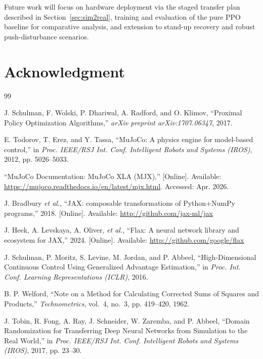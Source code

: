 \documentclass[conference]{IEEEtran}
\begin{document}
Future work will focus on hardware deployment via the staged transfer
plan described in Section~\ref{sec:sim2real}, training and evaluation
of the pure PPO baseline for comparative analysis, and extension to
stand-up recovery and robust push-disturbance scenarios.

\section*{Acknowledgment}


\begin{thebibliography}{99}

J. Schulman, F. Wolski, P. Dhariwal, A. Radford, and O. Klimov,
``Proximal Policy Optimization Algorithms,''
\emph{arXiv preprint arXiv:1707.06347}, 2017.

E. Todorov, T. Erez, and Y. Tassa,
``MuJoCo: A physics engine for model-based control,''
in \emph{Proc. IEEE/RSJ Int. Conf. Intelligent Robots and Systems (IROS)},
2012, pp. 5026--5033.

``MuJoCo Documentation: MuJoCo XLA (MJX),''
[Online]. Available:
\url{https://mujoco.readthedocs.io/en/latest/mjx.html}.
Accessed: Apr. 2026.

J. Bradbury \emph{et al.},
``JAX: composable transformations of Python+NumPy programs,''
2018. [Online]. Available: \url{http://github.com/jax-ml/jax}

J. Heek, A. Levskaya, A. Oliver, \emph{et al.},
``Flax: A neural network library and ecosystem for JAX,''
2024. [Online]. Available: \url{http://github.com/google/flax}

J. Schulman, P. Moritz, S. Levine, M. Jordan, and P. Abbeel,
``High-Dimensional Continuous Control Using Generalized Advantage
Estimation,''
in \emph{Proc. Int. Conf. Learning Representations (ICLR)}, 2016.

B. P. Welford,
``Note on a Method for Calculating Corrected Sums of Squares
and Products,''
\emph{Technometrics}, vol.~4, no.~3, pp. 419--420, 1962.

J. Tobin, R. Fong, A. Ray, J. Schneider, W. Zaremba, and P. Abbeel,
``Domain Randomization for Transferring Deep Neural Networks from
Simulation to the Real World,''
in \emph{Proc. IEEE/RSJ Int. Conf. Intelligent Robots and Systems (IROS)},
2017, pp. 23--30.


\end{thebibliography}
\end{document}
